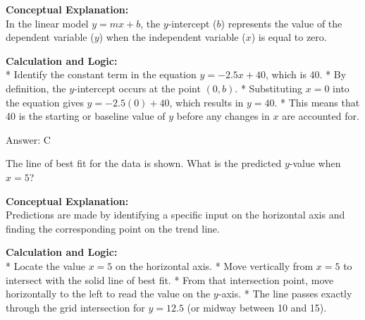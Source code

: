 \documentclass[11pt,paper=a4,answers]{exam}
\begin{document}
\begin{questions}
\begin{solution}
\textbf{Conceptual Explanation:} \\
In the linear model $y = mx + b$, the $y$-intercept ($b$) represents the value of the dependent variable ($y$) when the independent variable ($x$) is equal to zero.

\vspace{30pt}

\textbf{Calculation and Logic:} \\
* Identify the constant term in the equation $y = -2.5x + 40$, which is 40.
* By definition, the $y$-intercept occurs at the point $(0, b)$.
* Substituting $x = 0$ into the equation gives $y = -2.5(0) + 40$, which results in $y = 40$.
* This means that 40 is the starting or baseline value of $y$ before any changes in $x$ are accounted for.

\vspace{30pt}

Answer: \colorbox{yellow!100}{C}
\end{solution}

\vspace{60pt}

\question
\begin{center}
\end{center}
The line of best fit for the data is shown. What is the predicted $y$-value when $x = 5$?

\begin{solution}
\textbf{Conceptual Explanation:} \\
Predictions are made by identifying a specific input on the horizontal axis and finding the corresponding point on the trend line.

\vspace{30pt}

\textbf{Calculation and Logic:} \\
* Locate the value $x = 5$ on the horizontal axis.
* Move vertically from $x = 5$ to intersect with the solid line of best fit.
* From that intersection point, move horizontally to the left to read the value on the $y$-axis.
* The line passes exactly through the grid intersection for $y = 12.5$ (or midway between 10 and 15).


\end{solution}
\end{questions}
\end{document}
